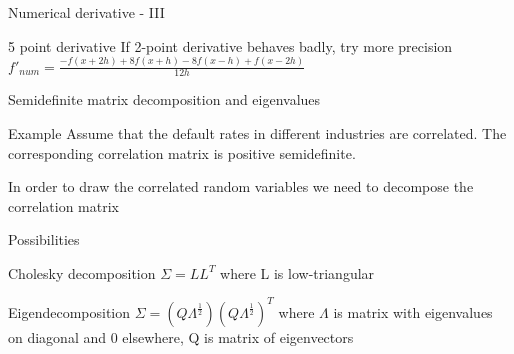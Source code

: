 \documentclass[presentation]{beamer}
\begin{document}
\begin{frame}[label=sec-1-3]{Numerical derivative - III}
\begin{block}{5 point derivative}
If 2-point derivative behaves badly, try more precision
$f'_{num} = \frac{-f(x+2h) + 8f(x+h) - 8f(x-h) + f(x-2h)}{12h}$
\end{block}
\end{frame}
\begin{frame}[label=sec-1-4]{Semidefinite matrix decomposition and eigenvalues}
\begin{block}{Example}
Assume that the default rates in different industries are correlated. The corresponding correlation matrix is positive semidefinite.
\end{block}
\begin{block}{In order to draw the correlated random variables we need to decompose the correlation matrix}
\end{block}
\begin{block}{Possibilities}
\begin{block}{Cholesky decomposition}
$\Sigma = LL^T$ where L is low-triangular
\end{block}
\begin{block}{Eigendecomposition}
$\Sigma = (Q\Lambda^{\frac{1}{2}})(Q\Lambda^{\frac{1}{2}})^T$ where $\Lambda$ is matrix with eigenvalues on diagonal and 0 elsewhere, Q is matrix of eigenvectors
\end{block}
\end{block}
\end{frame}
\end{document}
